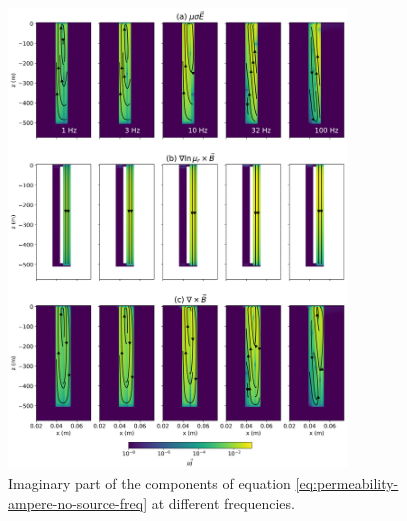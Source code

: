 \begin{figure}
    \begin{center}
    \includegraphics[width=0.8\textwidth]{figures/magnetization-currents-casing-freq-imag.png}
    \end{center}
\caption{
    Imaginary part of the components of equation \ref{eq:permeability-ampere-no-source-freq} at different frequencies.
}
\label{fig:magnetization-currents-casing-freq-imag}
\end{figure}



